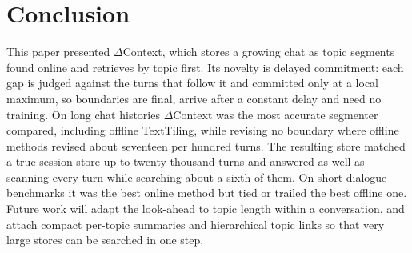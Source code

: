 \documentclass[journal]{IEEEtran}
\newcommand{\dc}{$\Delta$Context}
\begin{document}
\section{Conclusion}
\label{sec:concl}
This paper presented \dc{}, which stores a growing chat as topic segments
found online and retrieves by topic first. Its novelty is delayed commitment:
each gap is judged against the turns that follow it and committed only at a
local maximum, so boundaries are final, arrive after a constant delay and need
no training. On long chat histories \dc{} was the most accurate segmenter
compared, including offline TextTiling, while revising no boundary where
offline methods revised about seventeen per hundred turns. The resulting store
matched a true-session store up to twenty thousand turns and answered as well
as scanning every turn while searching about a sixth of them. On short dialogue
benchmarks it was the best online method but tied or trailed the best offline
one. Future work will adapt the look-ahead to topic length within a
conversation, and attach compact per-topic summaries and hierarchical topic
links so that very large stores can be searched in one step.
\end{document}
